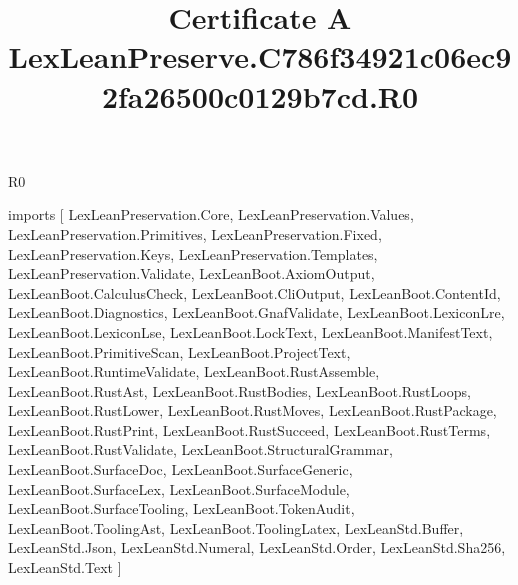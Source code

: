 \begin{lexlean}{R0}
\title{Certificate A LexLeanPreserve.C786f34921c06ec92fa26500c0129b7cd.R0}
\begin{coremodule}
imports [
  LexLeanPreservation.Core,
  LexLeanPreservation.Values,
  LexLeanPreservation.Primitives,
  LexLeanPreservation.Fixed,
  LexLeanPreservation.Keys,
  LexLeanPreservation.Templates,
  LexLeanPreservation.Validate,
  LexLeanBoot.AxiomOutput,
  LexLeanBoot.CalculusCheck,
  LexLeanBoot.CliOutput,
  LexLeanBoot.ContentId,
  LexLeanBoot.Diagnostics,
  LexLeanBoot.GnafValidate,
  LexLeanBoot.LexiconLre,
  LexLeanBoot.LexiconLse,
  LexLeanBoot.LockText,
  LexLeanBoot.ManifestText,
  LexLeanBoot.PrimitiveScan,
  LexLeanBoot.ProjectText,
  LexLeanBoot.RuntimeValidate,
  LexLeanBoot.RustAssemble,
  LexLeanBoot.RustAst,
  LexLeanBoot.RustBodies,
  LexLeanBoot.RustLoops,
  LexLeanBoot.RustLower,
  LexLeanBoot.RustMoves,
  LexLeanBoot.RustPackage,
  LexLeanBoot.RustPrint,
  LexLeanBoot.RustSucceed,
  LexLeanBoot.RustTerms,
  LexLeanBoot.RustValidate,
  LexLeanBoot.StructuralGrammar,
  LexLeanBoot.SurfaceDoc,
  LexLeanBoot.SurfaceGeneric,
  LexLeanBoot.SurfaceLex,
  LexLeanBoot.SurfaceModule,
  LexLeanBoot.SurfaceTooling,
  LexLeanBoot.TokenAudit,
  LexLeanBoot.ToolingAst,
  LexLeanBoot.ToolingLatex,
  LexLeanStd.Buffer,
  LexLeanStd.Json,
  LexLeanStd.Numeral,
  LexLeanStd.Order,
  LexLeanStd.Sha256,
  LexLeanStd.Text
]


\end{coremodule}
\end{lexlean}
